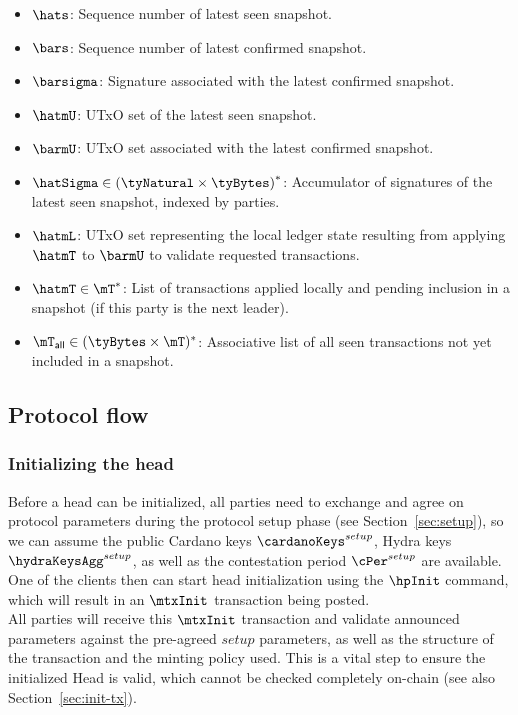 \begin{itemize}
	\item $\hats$: Sequence number of latest seen snapshot.
	\item $\bars$: Sequence number of latest confirmed snapshot.
	\item $\barsigma$: Signature associated with the latest confirmed snapshot.
	\item $\hatmU$: UTxO set of the latest seen snapshot.
	\item $\barmU$: UTxO set associated with the latest confirmed snapshot.
	\item $\hatSigma \in {(\tyNatural \times \tyBytes)}^{*}$: Accumulator of
	      signatures of the latest seen snapshot, indexed by parties.
	\item $\hatmL$: UTxO set representing the local ledger state resulting from
	      applying $\hatmT$ to $\barmU$ to validate requested transactions.
	\item $\hatmT \in \mT^{*}$: List of transactions applied locally and pending
	      inclusion in a snapshot (if this party is the next leader).
	\item $\mT_{\mathsf{all}} \in (\tyBytes \times \mT)^{*}$: Associative list of all
	      seen transactions not yet included in a snapshot.
\end{itemize}

\subsection{Protocol flow}

\subsubsection{Initializing the head}

\quad Before a head can be initialized, all parties need
to exchange and agree on protocol parameters during the protocol setup phase
(see Section~\ref{sec:setup}), so we can assume the public Cardano keys
$\cardanoKeys^{setup}$, Hydra keys $\hydraKeysAgg^{setup}$, as well as the
contestation period $\cPer^{setup}$ are available. One of the clients then can
start head initialization using the $\hpInit$ command, which will result in an
$\mtxInit$ transaction being posted. \\

\quad All parties will receive this $\mtxInit$
transaction and validate announced parameters against the pre-agreed $setup$
parameters, as well as the structure of the transaction and the minting policy
used. This is a vital step to ensure the initialized Head is valid, which
cannot be checked completely on-chain (see also Section~\ref{sec:init-tx}). \\

